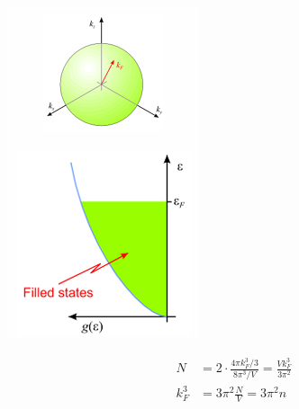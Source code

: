 \documentclass{article}
\theoremstyle{remark}
\theoremstyle{remark}
\begin{document}
\begin{enumerate}
\begin{minipage}{0.3\linewidth}
\begin{center}
                \includegraphics*[width=\linewidth]{cmp_Fermi_energy.png}
            \end{center}
        \end{minipage}
        \begin{minipage}{0.69\linewidth}
            \begin{align*}
                N &= 2\cdot\frac{4\pi k_F^3/3}{8\pi^3/V} = \frac{Vk_F^3}{3\pi^2}\\
                k_F^3 &= 3\pi^2\frac{N}{V}=3\pi^2n\\

\end{align*}
\end{minipage}
\end{enumerate}
\end{document}
